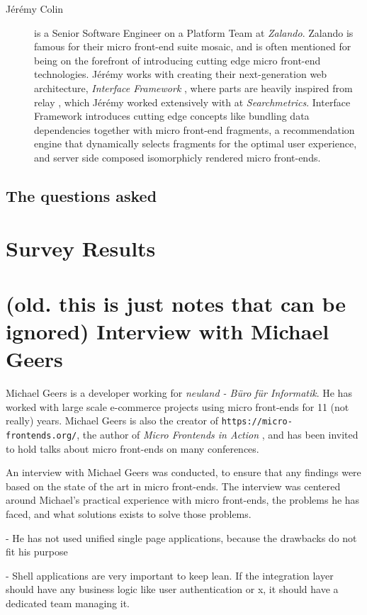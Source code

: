 \begin{description}
    \item[J\'er\'emy Colin] is a Senior Software Engineer on a Platform Team at \textit{Zalando}. Zalando is famous for their micro front-end suite mosaic, and is often mentioned for being on the forefront of introducing cutting edge micro front-end technologies. J\'er\'emy works with creating their next-generation web architecture, \textit{Interface Framework} \cite{temp}, where parts are heavily inspired from relay \cite{temp}, which J\'er\'emy worked extensively with at \textit{Searchmetrics}. Interface Framework introduces cutting edge concepts like bundling data dependencies together with micro front-end fragments, a recommendation engine that dynamically selects fragments for the optimal user experience, and server side composed isomorphicly rendered micro front-ends.
\end{description}

\subsection{The questions asked}


\section{Survey Results}



\section{(old. this is just notes that can be ignored) Interview with Michael Geers}
Michael Geers is a developer working for \textit{neuland - Büro für Informatik}. He has worked with large scale e-commerce projects using micro front-ends for 11 (not really) years. Michael Geers is also the creator of \texttt{https://micro-frontends.org/}, the author of \textit{Micro Frontends in Action} \cite{Geers2020}, and has been invited to hold talks about micro front-ends on many conferences.

An interview with Michael Geers was conducted, to ensure that any findings were based on the state of the art in micro front-ends. The interview was centered around Michael's practical experience with micro front-ends, the problems he has faced, and what solutions exists to solve those problems.

- He has not used unified single page applications, because the drawbacks do not fit his purpose

- Shell applications are very important to keep lean. If the integration layer should have any business logic like user authentication or x, it should have a dedicated team managing it.

